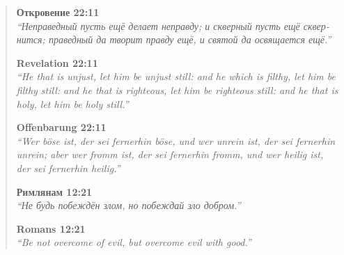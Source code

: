 \documentclass[11pt,a4paper]{article}
\theoremstyle{definition}
\theoremstyle{remark}
\begin{document}
\begin{abstract}
\begin{tcolorbox}[colback=blue!5!white, colframe=blue!75!black, width=0.9\textwidth, 
arc=3mm, boxrule=1pt]

\vspace{0.3cm}

{\large\foreignlanguage{russian}{
\textbf{Откровение 22:11}\\[0.3cm]
\textit{``Неправедный пусть ещё делает неправду; и скверный пусть ещё 
сквернится; праведный да творит правду ещё, и святой да освящается ещё.''}
}}

\vspace{0.8cm}

{\large
\textbf{Revelation 22:11}\\[0.3cm]
\textit{``He that is unjust, let him be unjust still: and he which is 
filthy, let him be filthy still: and he that is righteous, let him be 
righteous still: and he that is holy, let him be holy still.''}
}

\vspace{0.8cm}

{\large
\textbf{Offenbarung 22:11}\\[0.3cm]
\textit{``Wer böse ist, der sei fernerhin böse, und wer unrein ist, der 
sei fernerhin unrein; aber wer fromm ist, der sei fernerhin fromm, und 
wer heilig ist, der sei fernerhin heilig.''}
}

\vspace{0.3cm}

\end{tcolorbox}

\vspace{1.5cm}

\begin{tcolorbox}[colback=green!5!white, colframe=green!75!black, width=0.9\textwidth, 
arc=3mm, boxrule=1pt]

\vspace{0.3cm}

{\large\foreignlanguage{russian}{
\textbf{Римлянам 12:21}\\[0.3cm]
\textit{``Не будь побеждён злом, но побеждай зло добром.''}
}}

\vspace{0.8cm}

{\large
\textbf{Romans 12:21}\\[0.3cm]
\textit{``Be not overcome of evil, but overcome evil with good.''}
}

\vspace{0.8cm}


\end{tcolorbox}
\end{abstract}
\end{document}
